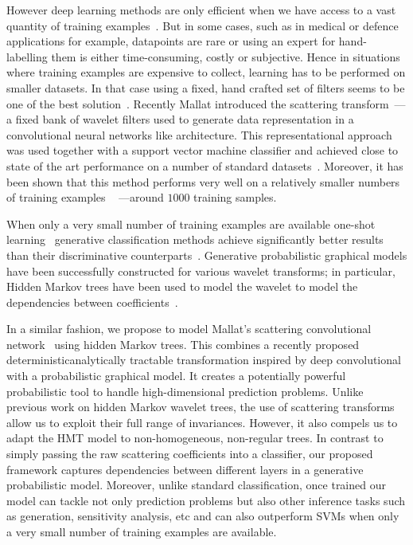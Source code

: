 \documentclass{article}
\begin{document}
  However deep learning methods are only efficient when we have access to a vast quantity of training examples~\cite{glorot2010understanding}. But in some cases, such as in medical or defence applications for example, datapoints are rare or using an expert for hand-labelling them is either time-consuming, costly or subjective. Hence in situations where training examples are expensive to collect, learning has to be performed on smaller
  datasets. In that case using a fixed, hand crafted set of filters seems to be one of the best solution~\cite{hsiang2001embedded}. Recently Mallat introduced the scattering transform~\cite{mallat2012gis}--- a fixed bank of wavelet filters used to generate data representation in a convolutional neural networks like architecture. This representational approach was used together with a support vector machine classifier and achieved close to state of the art performance on a number of standard datasets~\cite{bruna2010classification}. Moreover, it has been shown that this method performs very well on a relatively smaller numbers of training examples ~\cite{sifre2013rotation} ---\ie around $1000$ training samples.

  When only a very small number of training examples are available one-shot learning~\cite{fei2006one} generative classification methods achieve significantly better results than their discriminative counterparts~\cite{jordan2002discriminative}. Generative probabilistic graphical models have been successfully constructed for various wavelet transforms; in particular, Hidden Markov trees have been used to model the wavelet to model the dependencies between coefficients~\cite{crouse1998wavelet, kingsbury2001complex, durand2004computational}.
  
  In a similar fashion, we propose to model Mallat's scattering convolutional network~\cite{bruna2010classification} using hidden Markov trees. This combines a recently proposed deterministicanalytically tractable transformation inspired by deep convolutional with a probabilistic graphical model. It creates a potentially powerful probabilistic tool to handle high-dimensional prediction problems. Unlike previous work on hidden Markov wavelet trees, the use of scattering transforms allow us to exploit their full range of invariances. However, it also compels us to adapt the HMT model to non-homogeneous, non-regular trees. In contrast to simply passing the raw scattering coefficients into a classifier, our proposed framework captures dependencies between different layers in a generative probabilistic model. Moreover, unlike standard classification, once
  trained our model can tackle not only prediction problems but also other inference tasks such as generation, sensitivity analysis, etc and can also outperform SVMs when only a very small number of training examples are available.
\end{document}
